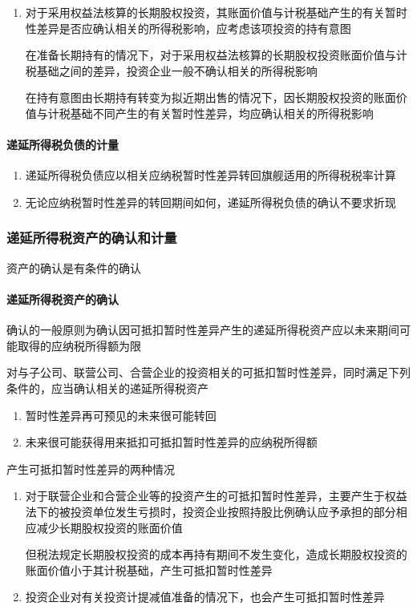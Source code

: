 \documentclass[UTF8,12pt]{ctexart}
\numberwithin{equation}{section} %
\numberwithin{figure}{section}
\numberwithin{table}{section}
\begin{document}
\begin{enumerate}
\begin{enumerate}
			\item 对于采用权益法核算的长期股权投资，其账面价值与计税基础产生的有关暂时性差异是否应确认相关的所得税影响，应考虑该项投资的持有意图
			
			在准备长期持有的情况下，对于采用权益法核算的长期股权投资账面价值与计税基础之间的差异，投资企业一般不确认相关的所得税影响
			
			在持有意图由长期持有转变为拟近期出售的情况下，因长期股权投资的账面价值与计税基础不同产生的有关暂时性差异，均应确认相关的所得税影响
		\end{enumerate}
	\end{enumerate}
	
	
	\paragraph{递延所得税负债的计量}
	\begin{enumerate}
		\item 递延所得税负债应以相关应纳税暂时性差异转回旗舰适用的所得税税率计算
		
		\item 无论应纳税暂时性差异的转回期间如何，递延所得税负债的确认不要求折现
	\end{enumerate}
	
	\subsubsection{递延所得税资产的确认和计量}
	资产的确认是有条件的确认
	\paragraph{递延所得税资产的确认}
	确认的一般原则为确认因可抵扣暂时性差异产生的递延所得税资产应以未来期间可能取得的应纳税所得额为限
	
	对与子公司、联营公司、合营企业的投资相关的可抵扣暂时性差异，同时满足下列条件的，应当确认相关的递延所得税资产
	\begin{enumerate}
		\item 暂时性差异再可预见的未来很可能转回
		
		\item 未来很可能获得用来抵扣可抵扣暂时性差异的应纳税所得额
	\end{enumerate}
	
	产生可抵扣暂时性差异的两种情况
	\begin{enumerate}
		\item 对于联营企业和合营企业等的投资产生的可抵扣暂时性差异，主要产生于权益法下的被投资单位发生亏损时，投资企业按照持股比例确认应予承担的部分相应减少长期股权投资的账面价值
		
		但税法规定长期股权投资的成本再持有期间不发生变化，造成长期股权投资的账面价值小于其计税基础，产生可抵扣暂时性差异
		
		\item 投资企业对有关投资计提减值准备的情况下，也会产生可抵扣暂时性差异
	\end{enumerate}
	
\end{document}
